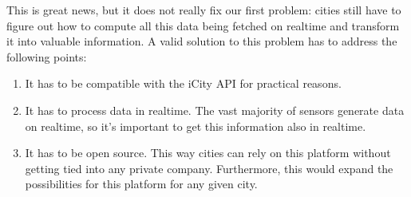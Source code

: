 This is great news, but it does not really fix our first problem: cities still
have to figure out how to compute all this data being fetched on realtime and
transform it into valuable information. A valid solution to this problem has to
address the following points:

\begin{enumerate}
  \itemsep0em
  \item It has to be compatible with the iCity API for practical reasons.
  \item It has to process data in realtime. The vast majority of sensors
generate data on realtime, so it's important to get this information also in
realtime.
  \item It has to be open source. This way cities can rely on this platform
without getting tied into any private company. Furthermore, this would expand
the possibilities for this platform for any given city.
\end{enumerate}
